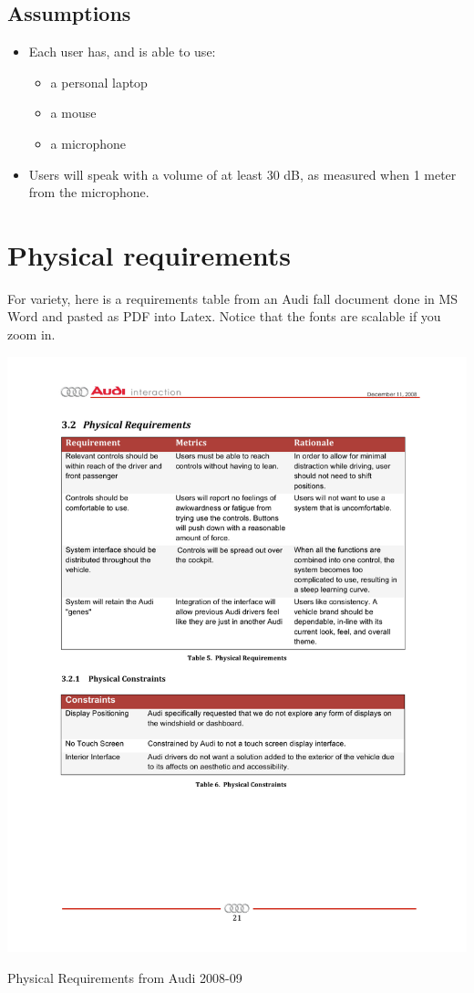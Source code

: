 \subsection{Assumptions}
\begin{itemize}\tightlist
\item Each user has, and is able to use:
\begin{itemize}\tightlist 
\item a personal laptop
\item a mouse
\item a microphone
\end{itemize}
\item Users will speak with a volume of at least 30 dB, as measured when 1 meter from the microphone.
\end{itemize}

\section{Physical requirements}
\label{sec:physicalreqs}

\color{blue}
For variety, here is a requirements table from an Audi fall document \cite{Audi2009Fall} done in MS Word and pasted as PDF into Latex. Notice that the fonts are scalable if you zoom in.
\normalcolor

\begin{table}[h]
	\centering
		\includegraphics[width=\textwidth]{Figures/Ch3/Audi08PhysReqs.pdf}
	\caption{Physical Requirements from Audi 2008-09}
	\label{tab:physical-requirements}
\end{table}


